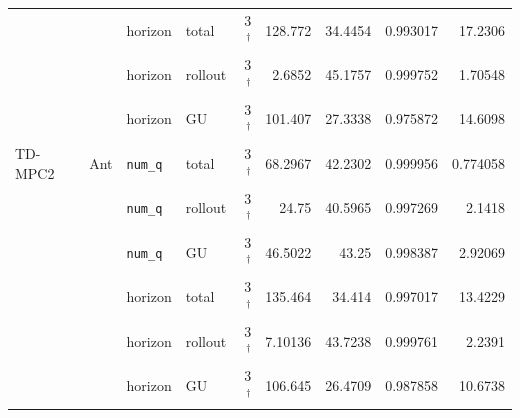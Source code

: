 {\begin{longtable}{@{}llllrrrrr@{}}
     &  & horizon & total & \num{3}$^{\dagger}$ & \num{128.772} & \num{34.4454} & \num{0.993017} & \num{17.2306} \\
     &  & horizon & rollout & \num{3}$^{\dagger}$ & \num{2.6852} & \num{45.1757} & \num{0.999752} & \num{1.70548} \\
     &  & horizon & GU & \num{3}$^{\dagger}$ & \num{101.407} & \num{27.3338} & \num{0.975872} & \num{14.6098} \\
    TD-MPC2 & Ant & \texttt{num\_q} & total & \num{3}$^{\dagger}$ & \num{68.2967} & \num{42.2302} & \num{0.999956} & \num{0.774058} \\
     &  & \texttt{num\_q} & rollout & \num{3}$^{\dagger}$ & \num{24.75} & \num{40.5965} & \num{0.997269} & \num{2.1418} \\
     &  & \texttt{num\_q} & GU & \num{3}$^{\dagger}$ & \num{46.5022} & \num{43.25} & \num{0.998387} & \num{2.92069} \\
     &  & horizon & total & \num{3}$^{\dagger}$ & \num{135.464} & \num{34.414} & \num{0.997017} & \num{13.4229} \\
     &  & horizon & rollout & \num{3}$^{\dagger}$ & \num{7.10136} & \num{43.7238} & \num{0.999761} & \num{2.2391} \\
     &  & horizon & GU & \num{3}$^{\dagger}$ & \num{106.645} & \num{26.4709} & \num{0.987858} & \num{10.6738} \\
  \end{longtable}
}
